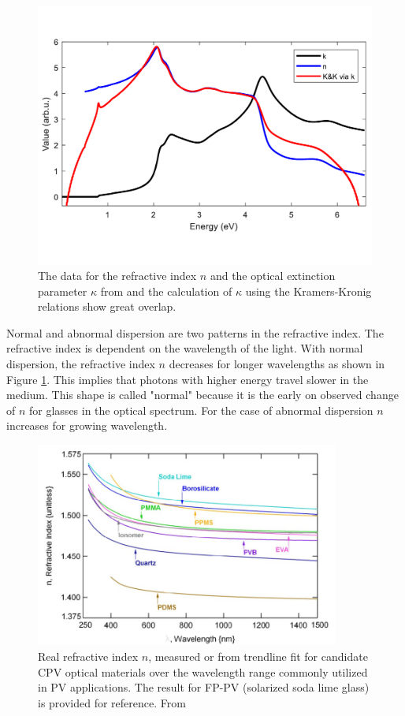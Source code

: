 \begin{figure}
    \centering
    \includegraphics[width = 12cm]{Bilder/Grundlagen/KramersKronig.pdf}
    \caption{The data for the refractive index $n$ and the optical extinction parameter $\kappa$ from \cite{Nunley.2016} and the calculation of $\kappa$ using the Kramers-Kronig relations show great overlap.} 
\end{figure}

Normal and abnormal dispersion are two patterns in the refractive index. The refractive index is dependent on the
wavelength of the light. With normal dispersion, the refractive index $n$ decreases for longer wavelengths as shown in Figure \ref{fig:nglass}. This implies that photons 
with higher energy travel slower in the medium. This shape is called "normal" because it is the early on observed 
change of $n$ for glasses in the optical spectrum. For the case of abnormal dispersion $n$ increases
for growing wavelength.

\begin{figure}[ht]
    \centering
    \includegraphics[width = 10cm]{Bilder/Grundlagen/DispersionGlass.png}
    \caption{Real refractive index $n$, measured or from trendline fit for candidate CPV optical materials over the wavelength range commonly utilized in PV applications. The result for FP-PV (solarized soda lime glass) is provided for reference. From \cite{Miller.2009}}
    \label{fig:nglass}
\end{figure}